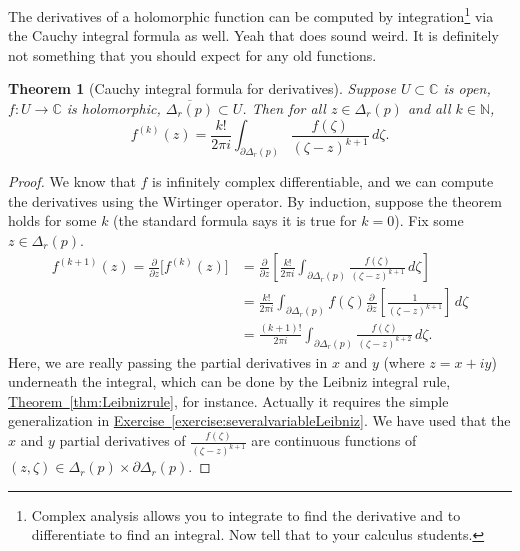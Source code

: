 \documentclass[12pt,openany]{book}
\newcommand{\C}{{\mathbb{C}}}
\newcommand{\N}{{\mathbb{N}}}
\theoremstyle{plain}
\newtheorem{thm}{Theorem}[section]
\theoremstyle{remark}
\theoremstyle{definition}
\theoremstyle{exercise}
\theoremstyle{example}
\newcommand{\exerciseref}[1]{\hyperref[#1]{Exercise~\ref*{#1}}}
\newcommand{\thmref}[1]{\hyperref[#1]{Theorem~\ref*{#1}}}
\begin{document}
The derivatives of a holomorphic function can be computed by
integration\footnote{Complex analysis allows you to integrate to find the
derivative and to differentiate to find an integral.  Now tell that to your
calculus students.} via the Cauchy integral formula as well.  Yeah that does sound
weird.  It is definitely not something that you should expect for any old
functions.

\begin{thm}[Cauchy integral formula for derivatives]
Suppose $U \subset \C$ is open, $f \colon U \to \C$ is holomorphic,
$\overline{\Delta_r(p)} \subset U$.
Then for all $z \in \Delta_r(p)$ and all $k \in \N$,
\begin{equation*}
f^{(k)}(z)
=
\frac{k!}{2\pi i}
\int_{\partial \Delta_r(p)}
\frac{f(\zeta)}{(\zeta-z)^{k+1}}
\,
d \zeta .
\end{equation*}
\end{thm}

\begin{proof}
We know that $f$ is infinitely complex differentiable, and we can compute
the derivatives using the Wirtinger operator.
By induction, suppose the theorem holds for some $k$
(the standard formula says it is true for $k=0$).  Fix some $z \in
\Delta_r(p)$.
\begin{equation*}
\begin{split}
f^{(k+1)}(z)
=
\frac{\partial }{\partial z}
\bigl[ f^{(k)}(z) \bigr]
& =
\frac{\partial }{\partial z}
\left[
\frac{k!}{2\pi i}
\int_{\partial \Delta_r(p)}
\frac{f(\zeta)}{(\zeta-z)^{k+1}}
\,
d \zeta
\right]
\\
& = 
\frac{k!}{2\pi i}
\int_{\partial \Delta_r(p)}
f(\zeta)
\frac{\partial }{\partial z}
\left[
\frac{1}{(\zeta-z)^{k+1}}
\right]
\,
d \zeta
\\
& = 
\frac{(k+1)!}{2\pi i}
\int_{\partial \Delta_r(p)}
\frac{f(\zeta)}{(\zeta-z)^{k+2}}
\,
d \zeta .
\end{split}
\end{equation*}
Here, we are really passing the partial derivatives in $x$ and $y$ (where $z=x+iy$)
underneath the integral,
which can be done by 
the Leibniz integral rule, \thmref{thm:Leibnizrule}, for instance.
Actually it requires the simple generalization in
\exerciseref{exercise:severalvariableLeibniz}.
We have used that the
$x$ and $y$ partial derivatives of 
$\frac{f(\zeta)}{(\zeta-z)^{k+1}}$ are continuous
functions of $(z,\zeta) \in \Delta_r(p) \times \partial \Delta_r(p)$.
\end{proof}
\end{document}

